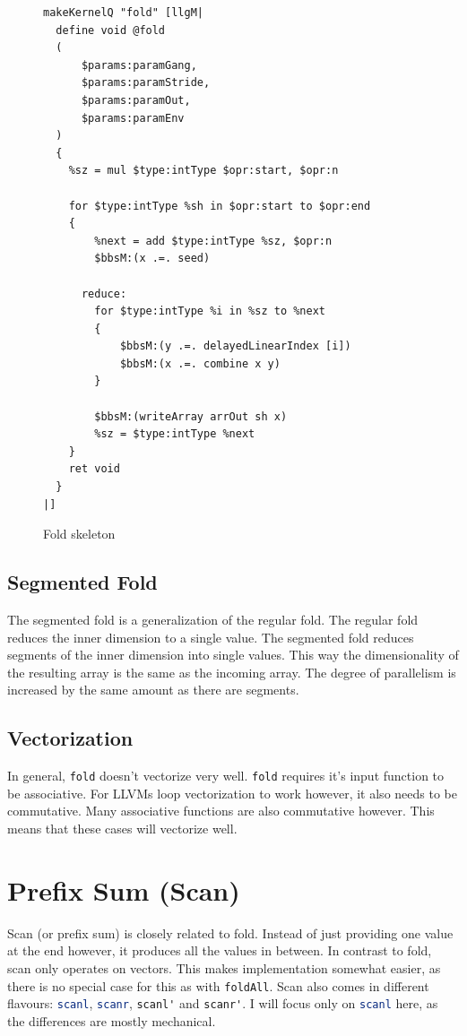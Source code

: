 \documentclass[a4paper,bibliography=totocnumbered,parskip,headsepline]{scrbook}
\begin{document}
\begin{figure}[h]
\begin{lstlisting}
makeKernelQ "fold" [llgM|
  define void @fold
  (
      $params:paramGang,
      $params:paramStride,
      $params:paramOut,
      $params:paramEnv
  )
  {
    %sz = mul $type:intType $opr:start, $opr:n

    for $type:intType %sh in $opr:start to $opr:end
    {
        %next = add $type:intType %sz, $opr:n
        $bbsM:(x .=. seed)

      reduce:
        for $type:intType %i in %sz to %next
        {
            $bbsM:(y .=. delayedLinearIndex [i])
            $bbsM:(x .=. combine x y)
        }

        $bbsM:(writeArray arrOut sh x)
        %sz = $type:intType %next
    }
    ret void
  }
|]
\end{lstlisting}
\caption{Fold skeleton}
\label{fig:foldskel}
\end{figure}

\subsection{Segmented Fold}
The segmented fold is a generalization of the regular fold.
The regular fold reduces the inner dimension to a single value.
The segmented fold reduces segments of the inner dimension into single values.
This way the dimensionality of the resulting array is the same as the incoming array.
The degree of parallelism is increased by the same amount as there are segments.

\subsection*{Vectorization}
In general, \lstinline[language=haskell]!fold! doesn't vectorize very well.
\lstinline[language=haskell]!fold! requires it's input function to be associative.
For LLVMs loop vectorization to work however, it also needs to be commutative.
Many associative functions are also commutative however.
This means that these cases will vectorize well.

\section{Prefix Sum (Scan)}
Scan (or prefix sum) is closely related to fold.
Instead of just providing one value at the end however, it produces all the values in between.
In contrast to fold, scan only operates on vectors.
This makes implementation somewhat easier, as there is no special case for this as with \lstinline[language=haskell]!foldAll!.
Scan also comes in different flavours: \lstinline[language=haskell]!scanl!, \lstinline[language=haskell]!scanr!, \lstinline[language=haskell]!scanl'! and \lstinline[language=haskell]!scanr'!.
I will focus only on \lstinline[language=haskell]!scanl! here, as the differences are mostly mechanical.
\end{document}
